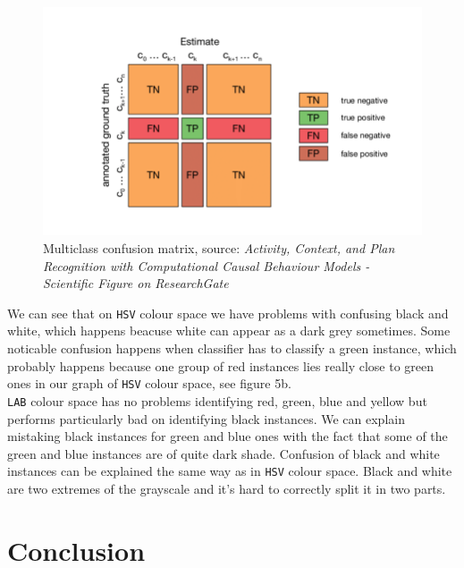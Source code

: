 \documentclass[12pt,a4paper]{article}
\begin{document}
	\begin{figure}[H]
		\centering
		\includegraphics[width=1\linewidth]{images/Confusion_matrix_explanation.png}
		\caption{Multiclass confusion matrix, source: \small \textit{Activity, Context, and Plan Recognition with Computational Causal Behaviour Models - Scientific Figure on ResearchGate}}
	\end{figure}


	We can see that on \texttt{HSV} colour space we have problems with confusing black and white, which happens beacuse white can appear as a dark grey sometimes. Some noticable confusion happens when classifier has to classify a green instance, which probably happens because one group of red instances lies really close to green ones in our graph of \texttt{HSV} colour space, see figure 5b. \\ 

	\texttt{LAB} colour space has no problems identifying red, green, blue and yellow but performs particularly bad on identifying black instances. We can explain mistaking black instances for green and blue ones with the fact that some of the green and blue instances are of quite dark shade. Confusion of black and white instances can be explained the same way as in \texttt{HSV} colour space. Black and white are two extremes of the grayscale and it's hard to correctly split it in two parts. \\

	\section{Conclusion}
\end{document}
